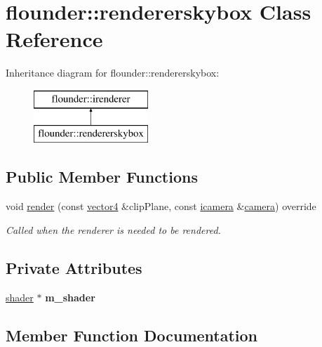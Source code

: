 \hypertarget{classflounder_1_1rendererskybox}{}\section{flounder\+:\+:rendererskybox Class Reference}
\label{classflounder_1_1rendererskybox}
Inheritance diagram for flounder\+:\+:rendererskybox\+:\begin{figure}[H]
\begin{center}
\leavevmode
\includegraphics[height=2.000000cm]{classflounder_1_1rendererskybox}
\end{center}
\end{figure}
\subsection*{Public Member Functions}
\begin{DoxyCompactItemize}
\item 
void \hyperlink{classflounder_1_1rendererskybox_a66714b2e580cd64a30e92d78a0260a33}{render} (const \hyperlink{classflounder_1_1vector4}{vector4} \&clip\+Plane, const \hyperlink{classflounder_1_1icamera}{icamera} \&\hyperlink{classflounder_1_1camera}{camera}) override
\begin{DoxyCompactList}\small\item\em Called when the renderer is needed to be rendered. \end{DoxyCompactList}\end{DoxyCompactItemize}
\subsection*{Private Attributes}
\begin{DoxyCompactItemize}
\item 
\mbox{\label{classflounder_1_1rendererskybox_adb28a7431338a5af369601d7c8ef73ff}} 
\hyperlink{classflounder_1_1shader}{shader} $\ast$ {\bfseries m\+\_\+shader}
\end{DoxyCompactItemize}


\subsection{Member Function Documentation}
\mbox{\label{classflounder_1_1rendererskybox_a66714b2e580cd64a30e92d78a0260a33}} 
